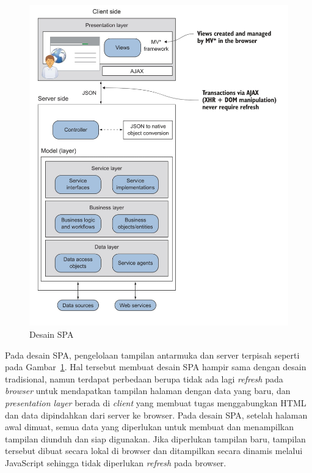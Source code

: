 \begin{figure}[H]
		\centering
	    \includegraphics[scale=0.9]{Gambar/spadesain.png}
	    \caption{Desain SPA~\cite{scott:15:spa}}
	    \label{fig:spadesain}
\end{figure}

Pada desain SPA, pengelolaan tampilan antarmuka dan server terpisah seperti pada Gambar~\ref{fig:spadesain}. Hal tersebut membuat desain SPA hampir sama dengan desain tradisional, namun terdapat perbedaan berupa tidak ada lagi \textit{refresh} pada \textit{browser} untuk mendapatkan tampilan halaman dengan data yang baru, dan \textit{presentation layer} berada di \textit{client} yang membuat tugas menggabungkan HTML dan data dipindahkan dari server ke browser. Pada desain SPA, setelah halaman awal dimuat, semua data yang diperlukan untuk membuat dan menampilkan tampilan diunduh dan siap digunakan. Jika diperlukan tampilan baru, tampilan tersebut dibuat secara lokal di browser dan ditampilkan secara dinamis melalui JavaScript sehingga tidak diperlukan \textit{refresh} pada browser.

